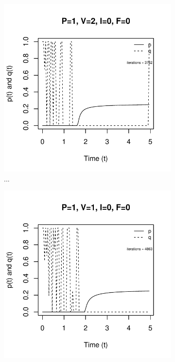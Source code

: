 \documentclass[12pt, oneside]{article}   	%
\begin{document}
 \begin{figure}[h]
   \centering
    \begin{subfigure}[t]{0.45\textwidth}
        \centering
       \includegraphics[width=\linewidth]{../../figures/unbranched-determinate-P=1-V=2,uniform(0,5)}  
        \caption{...} \label{fig:...}
    \end{subfigure}
    \hfill
    \begin{subfigure}[t]{0.45\textwidth}
        \centering
       \includegraphics[width=\linewidth]{../../figures/unbranched-determinate-P=1-V=1,uniform(0,5)}  

\end{subfigure}
\end{figure}
\end{document}
